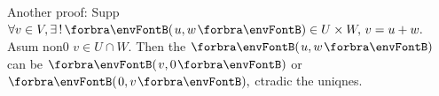 \BulletPointX\NoteForSmall{[1.45]}\;\;Another proof: Supp $\forall v\in V,\exists\,!\,\Par{u,w}\in U\times W,\,v=u+w.$\TextB{}
\Blind{\NoteForSmall{[1.45]}\;\;}Asum non0 $v\in U\cap W.$ Then the $\Par{u,w}$ can be $\Par{v,0}$ or $\Par{0,v},$ ctradic the uniqnes.\vspace{-2pt}
\SepLine




%

